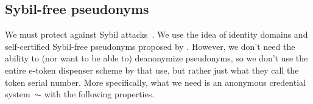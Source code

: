 \subsection{Sybil-free pseudonyms}%
\label{sybil-free-pseudonyms}

We must protect against Sybil attacks~\cite{SybilAttack}.
We use the idea of identity domains and self-certified Sybil-free pseudonyms 
proposed by \textcite{SelfCertifiedSybilFreePseudonyms}.
However, we don't need the ability to (nor want to be able to) deanonymize 
pseudonyms, so we don't use the entire e-token dispenser scheme by 
\textcite{HowToWinTheCloneWars} that 
\textcite{SelfCertifiedSybilFreePseudonyms} use, but rather just what they call 
the token serial number.
More specifically, what we need is an anonymous credential system~\(\AC\) with 
the following properties.


